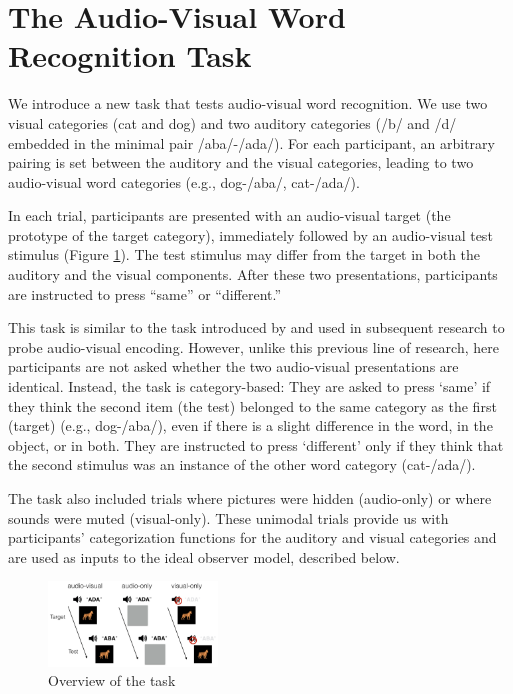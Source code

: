 \documentclass[10pt,letterpaper]{article}
\begin{document}
\section{The Audio-Visual Word Recognition Task}

We introduce a new task that tests audio-visual word recognition. We use two visual categories (cat and dog) and two auditory categories (/b/ and /d/ embedded in the minimal pair /aba/-/ada/). For each participant, an arbitrary pairing is set between the auditory and the visual categories, leading to two audio-visual word categories (e.g., dog-/aba/, cat-/ada/).

In each trial, participants are presented with an audio-visual target (the prototype of the target category), immediately followed by an audio-visual test stimulus (Figure \ref{fig:task}). The test stimulus may differ from the target in both the auditory and the visual components.  After these two presentations, participants are instructed to press ``same'' or ``different.''

This task is similar to the task introduced by  and used in subsequent research to probe audio-visual encoding. However, unlike this previous line of research, here participants are not asked whether the two audio-visual presentations are identical. Instead, the task is category-based: They are asked to press `same' if they think the second item (the test) belonged to the same category as the first (target) (e.g.,  dog-/aba/), even if there is a slight difference in the word, in the object, or in both. They are instructed to press `different' only if they think that the second stimulus was an instance of the other word category (cat-/ada/).

The task also included trials where pictures were hidden (audio-only) or where sounds were muted (visual-only). These unimodal trials provide us with participants' categorization functions for the auditory and visual categories and are used as inputs to the ideal observer model, described below.

\begin{figure}[tp]
\centering
\includegraphics[width=0.4\textwidth]{task1.png}
\caption{Overview of the task}
\label{fig:task}
\end{figure}
\end{document}
